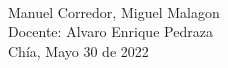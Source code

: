 \begin{titlepage}
\begin{minipage}{14cm}
\HRule \\[1.5cm]


{\Large
Manuel Corredor,
Miguel Malagon } \\[1cm]


{\Large
Docente: Alvaro Enrique Pedraza} \\[2cm]

{\large
Chía, Mayo 30 de 2022
}

\end{minipage}

\vfill %

\cleardoublepage
\thispagestyle{empty}
\end{titlepage}

\raggedbottom

